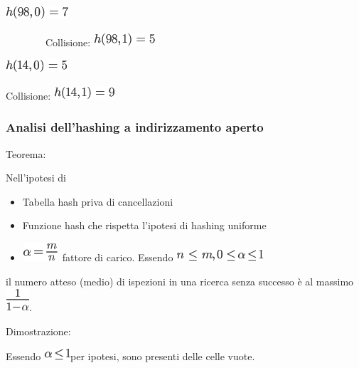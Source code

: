 \documentclass{article}
\providecommand{\tightlist}{%
  \setlength{\itemsep}{0pt}\setlength{\parskip}{0pt}}
\begin{document}
\includegraphics{images/image315.png}

{~~~~~~~~Collisione: }\includegraphics{images/image316.png}

\includegraphics{images/image317.png}

{Collisione: }\includegraphics{images/image318.png}

\hypertarget{h.wkyvylqq2lrt}{\subsubsection{\texorpdfstring{{Analisi
dell'hashing a indirizzamento
aperto}}{Analisi dell'hashing a indirizzamento aperto}}\label{h.wkyvylqq2lrt}}

{}

{Teorema}{: }

{Nell'ipotesi di}

\begin{itemize}
\tightlist
\item
  {Tabella hash priva di cancellazioni}
\item
  {Funzione hash che rispetta l'ipotesi di hashing uniforme}
\item
  \includegraphics{images/image319.png}{~fattore di carico. Essendo
  }\includegraphics{images/image320.png}
\end{itemize}

{il numero atteso (medio) di ispezioni in una ricerca senza successo è
al massimo }\includegraphics{images/image321.png}{.}

{Dimostrazione:}

{Essendo }\includegraphics{images/image322.png}{per ipotesi, sono
presenti delle celle vuote.}
\end{document}
